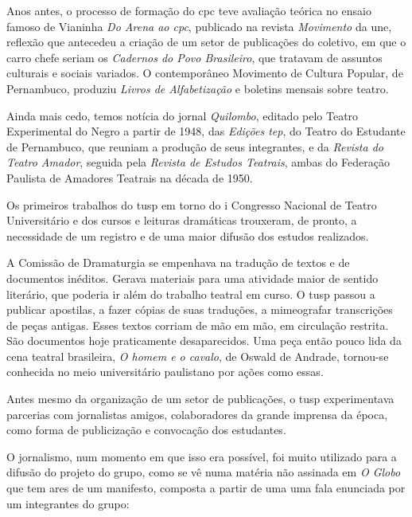 Anos antes, o processo de formação do {\sc cpc} teve avaliação teórica no
ensaio famoso de Vianinha {\it Do Arena ao {\sc cpc}}, publicado na revista
{\it Movimento} da {\sc une}, reflexão que antecedeu a criação de um setor de
publicações do coletivo, em que o carro chefe seriam os {\it Cadernos do
Povo Brasileiro}, que tratavam de assuntos culturais e sociais variados.
O contemporâneo Movimento de Cultura Popular, de Pernambuco, produziu
{\it Livros de Alfabetização} e boletins mensais sobre teatro.

Ainda mais cedo, temos notícia do jornal {\it Quilombo}, editado pelo
Teatro Experimental do Negro a partir de 1948, das {\it Edições {\sc tep}}, do
Teatro do Estudante de Pernambuco, que reuniam a produção de seus
integrantes, e da {\it Revista do Teatro Amador}, seguida pela
{\it Revista de Estudos Teatrais}, ambas do Federação Paulista de
Amadores Teatrais na década de 1950.

Os primeiros trabalhos do {\sc tusp} em torno do {\sc i} Congresso Nacional de
Teatro Universitário e dos cursos e leituras dramáticas trouxeram, de
pronto, a necessidade de um registro e de uma maior difusão dos estudos
realizados.

A Comissão de Dramaturgia se empenhava na tradução de textos e de
documentos inéditos. Gerava materiais para uma atividade maior de
sentido literário, que poderia ir além do trabalho teatral em curso. O
{\sc tusp} passou a publicar apostilas, a fazer cópias de suas traduções, a
mimeografar transcrições de peças antigas. Esses textos corriam de mão
em mão, em circulação restrita. São documentos hoje praticamente
desaparecidos. Uma peça então pouco lida da cena teatral brasileira,
{\it O homem e o cavalo}, de Oswald de Andrade, tornou-se conhecida no
meio universitário paulistano por ações como essas.


Antes mesmo da organização de um setor de publicações, o {\sc tusp}
experimentava parcerias com jornalistas amigos, colaboradores da grande
imprensa da época, como forma de publicização e convocação dos
estudantes.

O jornalismo, num momento em que isso era possível, foi muito utilizado
para a difusão do projeto do grupo, como se vê numa matéria não assinada
em {\it O Globo} que tem ares de um manifesto, composta a partir de uma
uma fala enunciada por um integrantes do grupo:

